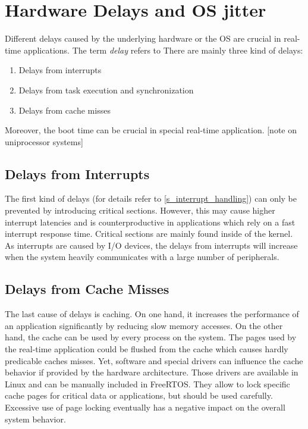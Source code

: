 \section{Hardware Delays and \ac{OS} jitter}
Different delays caused by the underlying hardware or the \ac{OS} are crucial in real-time applications.
The term \textit{delay} refers to 
There are mainly three kind of delays:
\begin{enumerate}
	\item Delays from interrupts
	\item Delays from task execution and synchronization
	\item Delays from cache misses
\end{enumerate}
Moreover, the boot time can be crucial in special real-time application.
[note on uniprocessor systems]

\subsection{Delays from Interrupts}
The first kind of delays (for details refer to \ref{s_interrupt_handling}) can only be prevented by introducing critical sections. 
However, this may cause higher interrupt latencies and is counterproductive in applications which rely on a fast interrupt response time.
Critical sections are mainly found inside of the kernel. 
As interrupts are caused by \ac{I/O} devices, the delays from interrupts will increase when the system heavily communicates with a large number of peripherals. 

\subsection{Delays from Cache Misses}
The last cause of delays is caching.
On one hand, it increases the performance of an application significantly by reducing slow memory accesses. 
On the other hand, the cache can be used by every process on the system.
The pages used by the real-time application could be flushed from the cache which causes hardly predicable caches misses.
Yet, software and special drivers can influence the cache behavior if provided by the hardware architecture.
Those drivers are available in Linux and can be manually included in FreeRTOS.
They allow to lock specific cache pages for critical data or applications, but should be used carefully.
Excessive use of page locking eventually has a negative impact on the overall system behavior.

